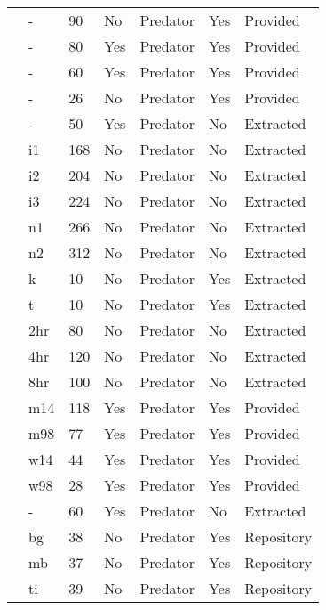 \begin{longtable}{lllllll}
\citet{Omkar:2004aa}&-&90&No&Predator&Yes&Provided\tabularnewline
\citet{Prokopenko:2017aa}&-&80&Yes&Predator&Yes&Provided\tabularnewline
\citet{Pusack:2018aa}&-&60&Yes&Predator&Yes&Provided\tabularnewline
\citet{Reeve:1997aa}&-&26&No&Predator&Yes&Provided\tabularnewline
\citet{Salt:1974aa}&-&50&Yes&Predator&No&Extracted\tabularnewline
\citet{Uttley:1980aa}&i1&168&No&Predator&No&Extracted\tabularnewline
\citet{Uttley:1980aa}&i2&204&No&Predator&No&Extracted\tabularnewline
\citet{Uttley:1980aa}&i3&224&No&Predator&No&Extracted\tabularnewline
\citet{Uttley:1980aa}&n1&266&No&Predator&No&Extracted\tabularnewline
\citet{Uttley:1980aa}&n2&312&No&Predator&No&Extracted\tabularnewline
\citet{Vahl:2005aa}&k&10&No&Predator&Yes&Extracted\tabularnewline
\citet{Vahl:2005aa}&t&10&No&Predator&Yes&Extracted\tabularnewline
\citet{Von-Westernhagen:1976aa}&2hr&80&No&Predator&No&Extracted\tabularnewline
\citet{Von-Westernhagen:1976aa}&4hr&120&No&Predator&No&Extracted\tabularnewline
\citet{Von-Westernhagen:1976aa}&8hr&100&No&Predator&No&Extracted\tabularnewline
\citet{Vucetich:2002aa}&m14&118&Yes&Predator&Yes&Provided\tabularnewline
\citet{Vucetich:2002aa}&m98&77&Yes&Predator&Yes&Provided\tabularnewline
\citet{Vucetich:2002aa}&w14&44&Yes&Predator&Yes&Provided\tabularnewline
\citet{Vucetich:2002aa}&w98&28&Yes&Predator&Yes&Provided\tabularnewline
\citet{Walde:1984aa}&-&60&Yes&Predator&No&Extracted\tabularnewline
\citet{Wasserman:2016aa,Wasserman:2016ab}&bg&38&No&Predator&Yes&Repository\tabularnewline
\citet{Wasserman:2016aa,Wasserman:2016ab}&mb&37&No&Predator&Yes&Repository\tabularnewline
\citet{Wasserman:2016aa,Wasserman:2016ab}&ti&39&No&Predator&Yes&Repository\tabularnewline
\hline
\end{longtable}
